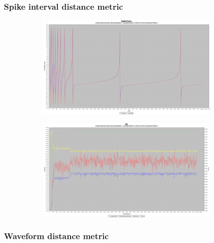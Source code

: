 \documentclass[12pt]{article}
\begin{document}
		\subsubsection{Spike interval distance metric}
			\begin{figure}[H]
				\centering
					\begin{subfigure}{.5\textwidth}
						\centering
						\includegraphics[width=\linewidth]{./../images/izzy4/interval/plot.png}
						
						\label{fig:sub11a}
					\end{subfigure}%
					\begin{subfigure}{.5\textwidth}
						\centering
						\includegraphics[width=\linewidth]{./../images/izzy4/interval/prog.png}
						
						\label{fig:sub11b}
					\end{subfigure}
					
					\label{fig:plot11}
			\end{figure}
		\subsubsection{Waveform distance metric}
	
\end{document}
